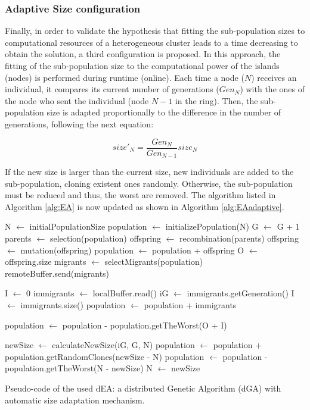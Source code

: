 \documentclass[final,1p,times]{elsarticle}
\begin{document}
\subsubsection{Adaptive Size configuration}



Finally, in order to validate the hypothesis that fitting the sub-population sizes to computational resources of a heterogeneous cluster leads to a time decreasing to obtain the solution, a third configuration is proposed. In this approach, the fitting of the sub-population size to the computational power of the islands (nodes) is performed during runtime (online).  Each time a node ($N$) receives an individual, it compares its current number of generations ($Gen_{N}$) with the ones of the node who sent the individual (node $N-1$ in the ring). Then, the sub-population size is adapted proportionally to the difference in the number of generations, following the next equation:

\begin{equation}
size'_{N}=\dfrac{Gen_{N}}{Gen_{N-1}}size_{N}
\end{equation}

If the new size is larger than the current size, new individuals are added to the sub-population, cloning  existent ones randomly. Otherwise, the sub-population must be reduced and thus, the worst are removed. The algorithm listed in Algorithm \ref{alg:EA} is now updated as shown in Algorithm \ref{alg:EAadaptive}.

\begin{algorithm}[htb]

\begin{algorithmic}
\STATE N $\gets$ initialPopulationSize
\STATE population $\gets$ initializePopulation(N)
    \STATE G $\gets$ G + 1
    \STATE parents $\gets$ selection(population)
    \STATE offspring $\gets$ recombination(parents)
    \STATE offspring $\gets$ mutation(offspring)
    \STATE population $\gets$ population + offspring
    \STATE O $\gets$ offspring.size
      \STATE migrants $\gets$ selectMigrants(population)
      \STATE remoteBuffer.send(migrants)
    \ENDIF

    \STATE I $\gets$ 0
      \STATE immigrants $\gets$ localBuffer.read()
      \STATE iG $\gets$ immigrants.getGeneration()
      \STATE I $\gets$ immigrants.size()
      \STATE population $\gets$ population + immigrants
    \ENDIF

    \STATE population $\gets$ population - population.getTheWorst(O + I)

    \STATE newSize $\gets$ calculateNewSize(iG, G, N)
        \STATE population $\gets$ population + population.getRandomClones(newSize - N)
    \ELSE
        \STATE population $\gets$ population - population.getTheWorst(N - newSize)
    \ENDIF
    \STATE N $\gets$ newSize
\ENDWHILE

\end{algorithmic}
\caption{Pseudo-code of the used dEA: a distributed Genetic Algorithm (dGA) with automatic size adaptation mechanism.}
\label{alg:EAadaptive}
\end{algorithm}
\end{document}
